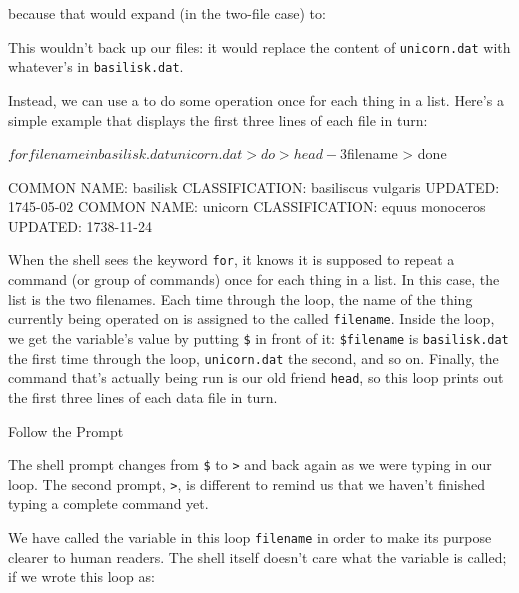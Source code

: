 \documentclass{book}
\begin{document}
because that would expand (in the two-file case) to:


This wouldn't back up our files: it would replace the content of
\texttt{unicorn.dat} with whatever's in \texttt{basilisk.dat}.

Instead, we can use a  to do some operation
once for each thing in a list. Here's a simple example that displays the
first three lines of each file in turn:

\begin{VerbIn}
$ for filename in basilisk.dat unicorn.dat
> do
>    head -3 $filename
> done
\end{VerbIn}

\begin{VerbOut}
COMMON NAME: basilisk
CLASSIFICATION: basiliscus vulgaris
UPDATED: 1745-05-02
COMMON NAME: unicorn
CLASSIFICATION: equus monoceros
UPDATED: 1738-11-24
\end{VerbOut}

When the shell sees the keyword \texttt{for}, it knows it is supposed to
repeat a command (or group of commands) once for each thing in a list.
In this case, the list is the two filenames. Each time through the loop,
the name of the thing currently being operated on is assigned to the
 called \texttt{filename}. Inside the
loop, we get the variable's value by putting \texttt{\$} in front of it:
\texttt{\$filename} is \texttt{basilisk.dat} the first time through the
loop, \texttt{unicorn.dat} the second, and so on. Finally, the command
that's actually being run is our old friend \texttt{head}, so this loop
prints out the first three lines of each data file in turn.

\begin{swcbox}{Follow the Prompt}

The shell prompt changes from \texttt{\$} to \texttt{\textgreater{}} and
back again as we were typing in our loop. The second prompt,
\texttt{\textgreater{}}, is different to remind us that we haven't
finished typing a complete command yet.

\end{swcbox}

We have called the variable in this loop \texttt{filename} in order to
make its purpose clearer to human readers. The shell itself doesn't care
what the variable is called; if we wrote this loop as:
\end{document}

